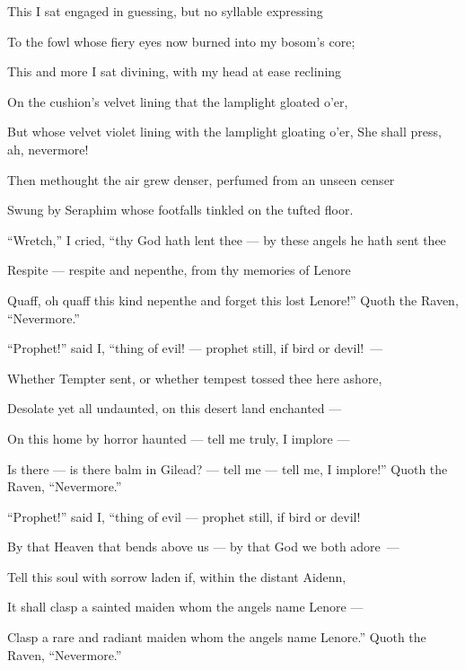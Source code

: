 \documentclass[openany]{book} %
\begin{document}
\bigskip
\par\noindent This I sat engaged in guessing, but no syllable expressing
\par\noindent To the fowl whose fiery eyes now burned into my bosom’s core;
\par\noindent This and more I sat divining, with my head at ease reclining
\par\noindent On the cushion’s velvet lining that the lamplight gloated o’er,
\par\noindent But whose velvet violet lining with the lamplight gloating o’er,
     She shall press, ah, nevermore!

\bigskip
\par\noindent Then methought the air grew denser, perfumed from an unseen censer
\par\noindent Swung by Seraphim whose footfalls tinkled on the tufted floor.
\par\noindent “Wretch,” I cried, “thy God hath lent thee — by these angels he hath sent thee
\par\noindent Respite — respite and nepenthe, from thy memories of Lenore
\par\noindent Quaff, oh quaff this kind nepenthe and forget this lost Lenore!”
     Quoth the Raven, “Nevermore.”

\bigskip
\par\noindent “Prophet!” said I, “thing of evil! — prophet still, if bird or devil!~—
\par\noindent Whether Tempter sent, or whether tempest tossed thee here ashore,
\par\noindent Desolate yet all undaunted, on this desert land enchanted —
\par\noindent On this home by horror haunted — tell me truly, I implore —
\par\noindent Is there — is there balm in Gilead? — tell me — tell me, I implore!”
     Quoth the Raven, “Nevermore.”

\bigskip
\par\noindent “Prophet!” said I, “thing of evil — prophet still, if bird or devil!
\par\noindent By that Heaven that bends above us — by that God we both adore~—
\par\noindent Tell this soul with sorrow laden if, within the distant Aidenn,
\par\noindent It shall clasp a sainted maiden whom the angels name Lenore —
\par\noindent Clasp a rare and radiant maiden whom the angels name Lenore.”
     Quoth the Raven, “Nevermore.”
\end{document}
